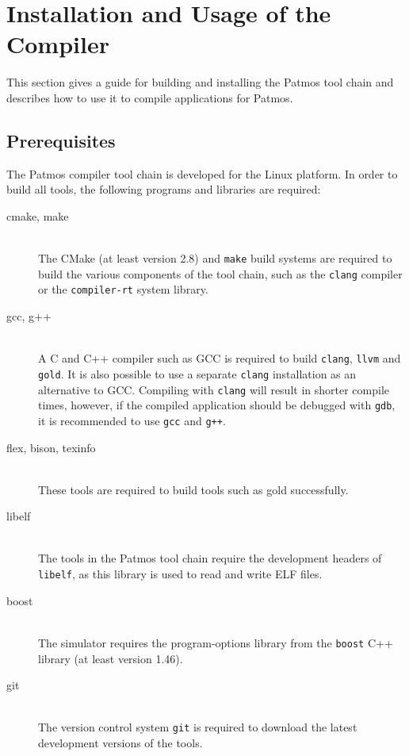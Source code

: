 
\section{Installation and Usage of the Compiler}
\label{sec:using_the_compiler}

This section gives a guide for building and installing the Patmos
tool chain and describes how to use it to compile applications for Patmos. 

\subsection{Prerequisites}

The Patmos compiler tool chain is developed for the Linux platform. 
In order to build all tools, the following programs and libraries are required:

\begin{description}
\item[cmake, make] \hfill\\
The CMake (at least version 2.8) and \texttt{make} build systems are required to build the
various components of the tool chain, such as the \texttt{clang} compiler or the \texttt{compiler-rt} system library.
\medskip

\item[gcc, g++] \hfill\\
A C and C++ compiler such as GCC is required to build \texttt{clang}, \texttt{llvm}
and \texttt{gold}. It is also possible to use a separate \texttt{clang} installation as 
an alternative to GCC. Compiling with \texttt{clang} will result in shorter compile
times, however, if the compiled application should be debugged with \texttt{gdb}, it is
recommended to use \texttt{gcc} and \texttt{g++}.
\medskip

\item[flex, bison, texinfo] \hfill\\
These tools are required to build tools such as gold successfully.
\medskip

\item[libelf] \hfill\\
The tools in the Patmos tool chain require the development headers of \texttt{libelf},
as this library is used to read and write ELF files.
\medskip

\item[boost] \hfill\\
The simulator requires the program-options library from the \texttt{boost} C++ library
(at least version 1.46).
\medskip

\item[git] \hfill\\
The version control system \texttt{git} is required 
to download the latest development versions of the tools. 
\end{description}

